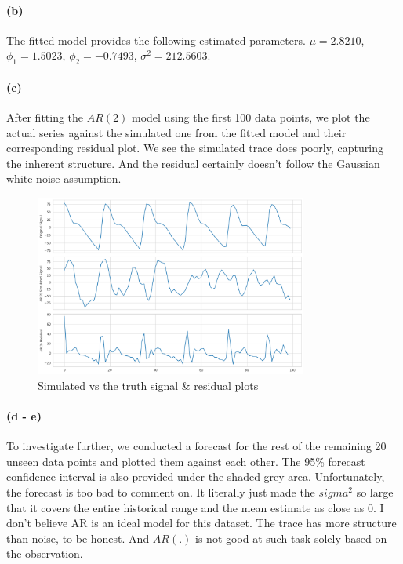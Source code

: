 \documentclass[11pt, letterpaper]{article}
\begin{document}
\paragraph{(b)} The fitted model provides the following estimated parameters. $\mu=2.8210$, $\phi_1 = 1.5023$, $\phi_2 = -0.7493$, $\sigma^2 = 212.5603$.

\paragraph{(c)} After fitting the $AR(2)$ model using the first 100 data points, we plot the actual series against the simulated one from the fitted model and their corresponding residual plot. We see the simulated trace does poorly, capturing the inherent structure. And the residual certainly doesn't follow the Gaussian white noise assumption.
\begin{figure}[!h]
  \centering
  \includegraphics[width=0.8\textwidth]{plot2.png}
  \captionsetup{justification=centering}
  \caption{Simulated vs the truth signal & residual plots}
\end{figure}

\paragraph{(d - e)} To investigate further, we conducted a forecast for the rest of the remaining 20 unseen data points and plotted them against each other. The 95\% forecast confidence interval is also provided under the shaded grey area. Unfortunately, the forecast is too bad to comment on. It literally just made the $sigma^2$ so large that it covers the entire historical range and the mean estimate as close as 0. I don't believe AR is an ideal model for this dataset. The trace has more structure than noise, to be honest. And $AR(.)$ is not good at such task solely based on the observation.
\end{document}
